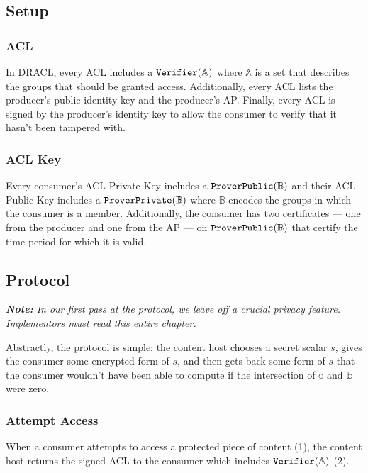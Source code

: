 \documentclass[pdftex,12pt,a4papaer,twoside,notitlepage]{report}
\newcommand{\note}[1]{\vspace{1em} \begin{spacing}{1}\textit{\textbf{Note:} #1}\end{spacing}\vspace{1em}}
\begin{document}
\subsection{Setup}

\subsubsection{ACL}

In DRACL, every ACL includes a $\operatorname{\mathtt{Verifier}}(\mathbb{A})$ where $\mathbb{A}$ is a set that describes
the groups that should be granted access. Additionally, every ACL lists the
producer's public identity key and the producer's AP. Finally, every ACL is
signed by the producer's identity key to allow the consumer to verify that it
hasn't been tampered with.

\subsubsection{ACL Key}
\label{sec:proto-acl-key}

Every consumer's ACL Private Key includes a $\operatorname{\mathtt{ProverPublic}}(\mathbb{B})$ and their ACL Public Key
includes a $\operatorname{\mathtt{ProverPrivate}}(\mathbb{B})$ where $\mathbb{B}$ encodes the groups in which the consumer is
a member. Additionally, the consumer has two certificates --- one from the
producer and one from the AP --- on $\operatorname{\mathtt{ProverPublic}}(\mathbb{B})$ that certify the time period for which
it is valid.

\subsection{Protocol}

\note{In our first pass at the protocol, we leave off a crucial privacy feature.
  Implementors must read this entire chapter.}

Abstractly, the protocol is simple: the content host chooses a secret scalar
$s$, gives the consumer some encrypted form of $s$, and then gets back some form
of $s$ that the consumer wouldn't have been able to compute if the intersection
of $\mathbb{a}$ and $\mathbb{b}$ were zero.

\subsubsection{Attempt Access}
\label{sec:proto-attempt-access}

When a consumer attempts to access a protected piece of content (1), the content
host returns the signed ACL to the consumer which includes $\operatorname{\mathtt{Verifier}}(\mathbb{A})$ (2).
\end{document}
